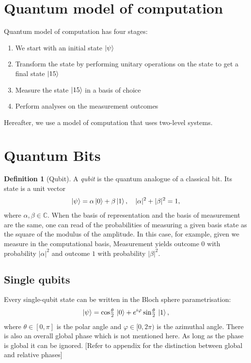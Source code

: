 \documentclass[12pt, a4paper, oneside]{report}
\theoremstyle{plain}
\theoremstyle{definition}
\newtheorem{definition}[theorem]{Definition}
\theoremstyle{remark}
\newcommand{\CC}{\mathbb{C}}
\begin{document}
\section{Quantum model of computation}

Quantum model of computation has four stages:
\begin{enumerate}
	\item We start with an initial state $\ket{\psi}$
	\item Transform the state by performing unitary operations on the state to get a final state $\ket{15}$
	\item Measure the state $\ket{15}$ in a basis of choice
	\item Perform analyses on the measurement outcomes
\end{enumerate}

Hereafter, we use a model of computation that uses two-level systems.



\section{Quantum Bits}

\begin{definition}[Qubit]
	A \emph{qubit} is the quantum analogue of a classical bit. Its state is a unit vector
	\[
		\ket{\psi} = \alpha\ket{0} + \beta\ket{1}, \quad |\alpha|^2 + |\beta|^2 = 1,
	\]
	where $\alpha, \beta \in \CC$. When the basis of representation and the basis of measurement are the same, one can read of the probabilities of measuring a given basis state as the square of the modulus of the amplitude. In this case, for example, given we measure in the computational basis, Measurement yields outcome $0$ with probability $|\alpha|^2$
	and outcome $1$ with probability $|\beta|^2$.
\end{definition}

\subsection{Single qubits}
Every single-qubit state can be written in the Bloch sphere parametrisation:
\[
	\ket{\psi} = \cos\!\tfrac{\theta}{2}\,\ket{0} + e^{i\varphi}\sin\!\tfrac{\theta}{2}\,\ket{1},
\]
where $\theta \in [0,\pi]$ is the polar angle and $\varphi \in [0, 2\pi)$ is the azimuthal angle. There is also an overall global phase which is not mentioned here. As long as the phase is global it can be ignored. [Refer to appendix for the distinction between global and relative phases]
\end{document}
